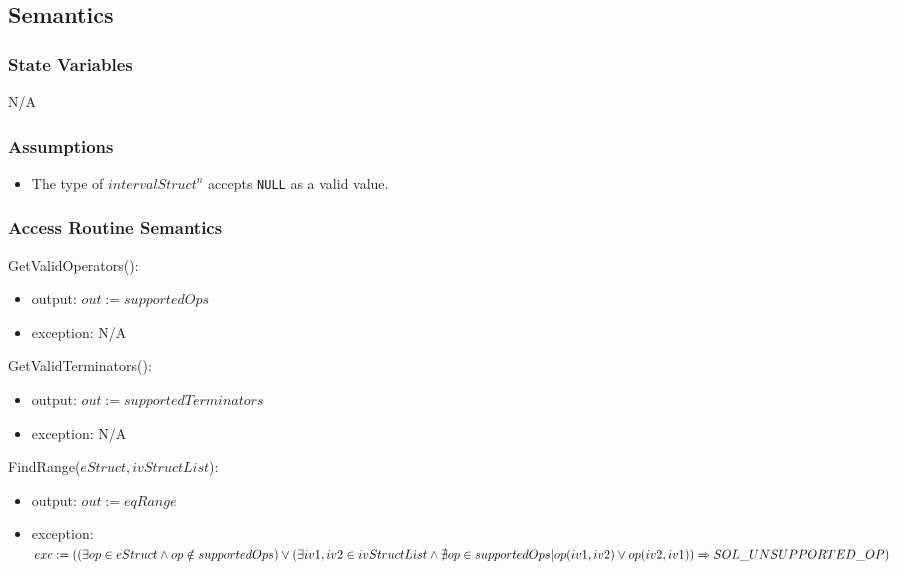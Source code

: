 \documentclass[12pt, titlepage]{article}
\begin{document}
\subsection{Semantics}

\subsubsection{State Variables}

N/A

\subsubsection{Assumptions}

\begin{itemize}
	\item The type of $intervalStruct^n$ accepts \texttt{NULL} as a valid value.
\end{itemize}

\subsubsection{Access Routine Semantics}

\noindent GetValidOperators():
\begin{itemize}
	\item output: $out := supportedOps$
	\item exception: N/A
\end{itemize}

\noindent GetValidTerminators():
\begin{itemize}
	\item output: $out := supportedTerminators$
	\item exception: N/A
\end{itemize}

\noindent FindRange($eStruct, ivStructList$):
\begin{itemize}
	\item output: $out := eqRange$
	\item exception: $exc := \\
	((\exists op \in eStruct \wedge op \notin supportedOps) \\
	\vee (\exists iv1, iv2 \in ivStructList \wedge \nexists op \in supportedOps 
	| op(iv1, iv2) \vee op(iv2, iv1)) \\
	\Rightarrow SOL\_UNSUPPORTED\_OP)$ 
\end{itemize}

\newpage
\end{document}
